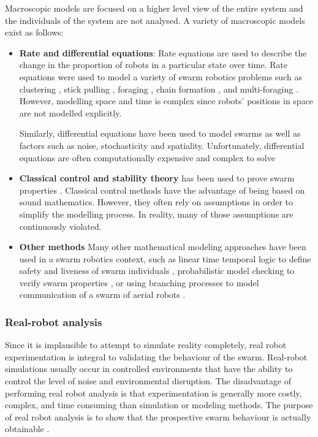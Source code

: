 Macroscopic models are focused on a higher level view of the entire system and the individuals of the system are not analysed. A variety of macroscopic models exist as follows: 
\begin{itemize}
	\item \textbf{Rate and differential equations}: Rate equations are used to describe the change in the proportion of robots in a particular state over time. Rate equations were used to model a variety of swarm robotics problems such as  clustering \cite{martinoli1999understanding}, stick pulling \cite{lerman2001macroscopic}, foraging \cite{lerman2002mathematical}, chain formation \cite{trianni2002modeling}, and multi-foraging \cite{campo2007efficient}. However, modelling space and time is complex since robots' positions in space are not modelled explicitly.

Similarly, differential equations have been used to model swarms as well as factors such as noise, stochasticity and spatiality. Unfortunately, differential equations are often computationally expensive and complex to solve \cite{hamann2008framework, prorok2011multi}

	\item \textbf{Classical control and stability theory} has been used to prove swarm properties \cite{gazi2005stability,liu2004stable, schwager2011time}.  Classical control methods have the advantage of being based on sound mathematics. However, they often rely on assumptions in order to simplify the modelling process. In reality, many of those assumptions are continuously violated.
	
	\item \textbf{Other methods}
	Many other mathematical modeling approaches have been used in a swarm robotics context, such as linear time temporal logic to define safety and liveness of swarm individuals \cite{winfield2005formal}, probabilistic model checking to verify swarm properties \cite{konur2012analysing}, or using branching processes to model communication of a swarm of aerial robots \cite{mathews2010establishing}. 
\end{itemize}

\subsubsection{Real-robot analysis}

Since it is implausible to attempt to simulate reality completely, real robot experimentation is integral to validating the behaviour of the swarm. Real-robot simulations usually occur in controlled environments that have the ability to control the level of noise and environmental disruption. 
The disadvantage of performing real robot analysis is that experimentation is generally more costly, complex, and time consuming than simulation or modeling methods. The purpose of real robot analysis is to show that the prospective swarm behaviour is actually obtainable \cite{brambilla2013swarm}.

